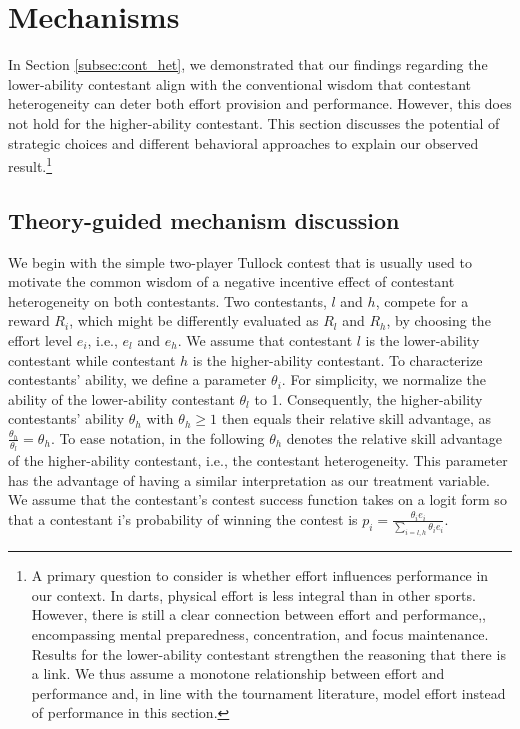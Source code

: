 \documentclass[11pt,a4paper]{article}
\let\Oldsection\section
\renewcommand{\section}{\FloatBarrier\Oldsection}
\begin{document}
\section{Mechanisms}\label{sec:disc}

In Section \ref{subsec:cont_het}, we demonstrated that our findings regarding the lower-ability contestant align with the conventional wisdom that contestant heterogeneity can deter both effort provision and performance. However, this does not hold for the higher-ability contestant. This section discusses the potential of strategic choices and different behavioral approaches to explain our observed result.\footnote{A primary question to consider is whether effort influences performance in our context. In darts, physical effort is less integral than in other sports. However, there is still a clear connection between effort and performance,, encompassing mental preparedness, concentration, and focus maintenance. Results for the lower-ability contestant strengthen the reasoning that there is a link. We thus assume a monotone relationship between effort and performance and, in line with the tournament literature, model effort instead of performance in this section.}\par

\subsection{Theory-guided mechanism discussion}\label{subsec:tdisc}
 
We begin with the simple two-player Tullock contest that is usually used to motivate the common wisdom of a negative incentive effect of contestant heterogeneity on both contestants. Two contestants, $l$ and $h$, compete for a reward $R_i$, which might be differently evaluated as $R_l$ and $R_h$, by choosing the effort level $e_i$, i.e., $e_l$ and $e_h$. We assume that contestant $l$ is the lower-ability contestant while contestant $h$ is the higher-ability contestant. To characterize contestants' ability, we define a parameter $\theta_i$. For simplicity, we normalize the ability of the lower-ability contestant $\theta_l$ to 1. Consequently, the higher-ability contestants' ability $\theta_h$ with $\theta_h \geq 1$ then equals their relative skill advantage, as $\frac{\theta_h}{\theta_l}=\theta_h$. To ease notation, in the following $\theta_h$ denotes the relative skill advantage of the higher-ability contestant, i.e., the contestant heterogeneity. This parameter has the advantage of having a similar interpretation as our treatment variable. We assume that the contestant's contest success function takes on a logit form so that a contestant i’s probability of winning the contest is $ p_i =\frac{\theta_i e_i}{ \sum_{i=l,h} \theta_i e_i}$.\par
\end{document}
